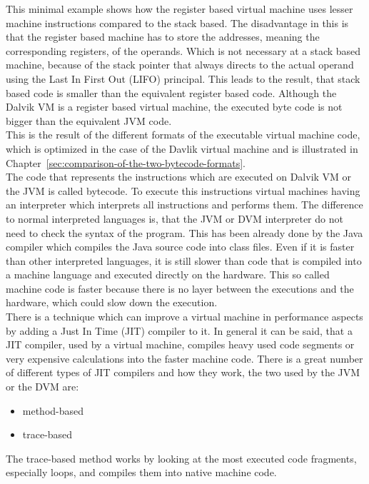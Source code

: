 This minimal example shows how the register based virtual machine uses lesser machine instructions compared to the stack based.
The disadvantage in this is that the register based machine has to store the addresses, meaning the corresponding registers, of the operands.
Which is not necessary at a stack based machine, because of the stack pointer that always directs to the actual operand using the Last In First Out (LIFO) principal.
This leads to the result, that stack based code is smaller than the equivalent register based code.
Although the Dalvik VM is a register based virtual machine, the executed byte code is not bigger than the equivalent JVM code.~\cite{shi2008virtual}\\
This is the result of the different formats of the executable virtual machine code, which is optimized in the case of the Davlik virtual machine and is illustrated in Chapter~\ref{sec:comparison-of-the-two-bytecode-formats}.
\\
The code that represents the instructions which are executed on Dalvik VM or the JVM is called bytecode.
To execute this instructions virtual machines having an interpreter which interprets all instructions and performs them.
The difference to normal interpreted languages is, that the JVM or DVM interpreter do not need to check the syntax of the program.
This has been already done by the Java compiler which compiles the Java source code into class files.
Even if it is faster than other interpreted languages, it is still slower than code that is compiled into a machine language and executed directly on the hardware.
This so called machine code is faster because there is no layer between the executions and the hardware, which could slow down the execution.~\cite{aycock2003brief}\\
There is a technique which can improve a virtual machine in performance aspects by adding a Just In Time (JIT) compiler to it.
In general it can be said, that a JIT compiler, used by a virtual machine, compiles heavy used code segments or very expensive calculations into the faster machine code.
There is a great number of different types of JIT compilers and how they work, the two used by the JVM or the DVM are:
\begin{itemize}
\item method-based
\item trace-based
\end{itemize}
The trace-based method works by looking at the most executed code fragments, especially loops, and compiles them into native machine code.\\
